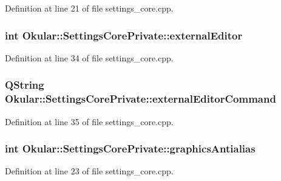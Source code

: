 Definition at line 21 of file settings\+\_\+core.\+cpp.

\hypertarget{classOkular_1_1SettingsCorePrivate_af0218eba4a88280bdba51f897a69dcbd}{
\subsubsection[{external\+Editor}]{\setlength{\rightskip}{0pt plus 5cm}int Okular\+::\+Settings\+Core\+Private\+::external\+Editor}}\label{classOkular_1_1SettingsCorePrivate_af0218eba4a88280bdba51f897a69dcbd}


Definition at line 34 of file settings\+\_\+core.\+cpp.

\hypertarget{classOkular_1_1SettingsCorePrivate_a42790939dfdac0ad0671710bce6aac67}{
\subsubsection[{external\+Editor\+Command}]{\setlength{\rightskip}{0pt plus 5cm}Q\+String Okular\+::\+Settings\+Core\+Private\+::external\+Editor\+Command}}\label{classOkular_1_1SettingsCorePrivate_a42790939dfdac0ad0671710bce6aac67}


Definition at line 35 of file settings\+\_\+core.\+cpp.

\hypertarget{classOkular_1_1SettingsCorePrivate_a7c39944a883c59a551e351d7d4260b6f}{
\subsubsection[{graphics\+Antialias}]{\setlength{\rightskip}{0pt plus 5cm}int Okular\+::\+Settings\+Core\+Private\+::graphics\+Antialias}}\label{classOkular_1_1SettingsCorePrivate_a7c39944a883c59a551e351d7d4260b6f}


Definition at line 23 of file settings\+\_\+core.\+cpp.

